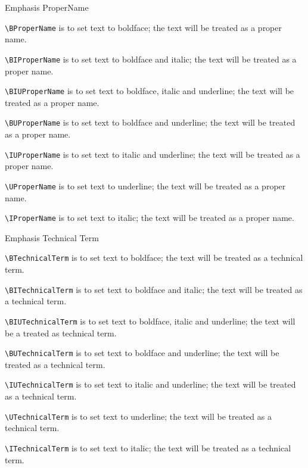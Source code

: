 \documentclass[12pt,Bold,letterpaper,TexShade]{mcgilletdclass}
\begin{document}
\begin{BulletList}
		\item{Emphasis ProperName}
		\begin{romanList}
			\item{ \verb=\BProperName= is to set text to boldface; the text will be treated as a proper name}.
			\item{ \verb=\BIProperName= is to set text to boldface and italic; the text will be treated as a proper name}.
			\item{ \verb=\BIUProperName= is to set text to boldface, italic and underline; the text will be treated as a proper name}.
			\item{ \verb=\BUProperName= is to set text to boldface and underline; the text will be treated as a proper name}.
			\item{ \verb=\IUProperName= is to set text to italic and underline; the text will be treated as a proper name}.
			\item{ \verb=\UProperName= is to set text to underline; the text will be treated as a proper name}.
			\item{ \verb=\IProperName= is to set text to italic; the text will be treated as a proper name}.
		\end{romanList}
		\item{Emphasis Technical Term}
		\begin{romanList}
			\item{ \verb=\BTechnicalTerm= is to set text to boldface; the text will be treated as a technical term}.
			\item{ \verb=\BITechnicalTerm= is to set text to boldface and italic; the text will be treated as a technical term}.
			\item{ \verb=\BIUTechnicalTerm= is to set text to boldface, italic and underline; the text will be a treated as technical term}.
			\item{ \verb=\BUTechnicalTerm= is to set text to boldface and underline; the text will be treated as a technical term}.
			\item{ \verb=\IUTechnicalTerm= is to set text to italic and underline; the text will be treated as a technical term}.
			\item{ \verb=\UTechnicalTerm= is to set text to underline; the text will be treated as a technical term}.
			\item{ \verb=\ITechnicalTerm= is to set text to italic; the text will be treated as a technical term}.
		\end{romanList}


\end{BulletList}
\end{document}

